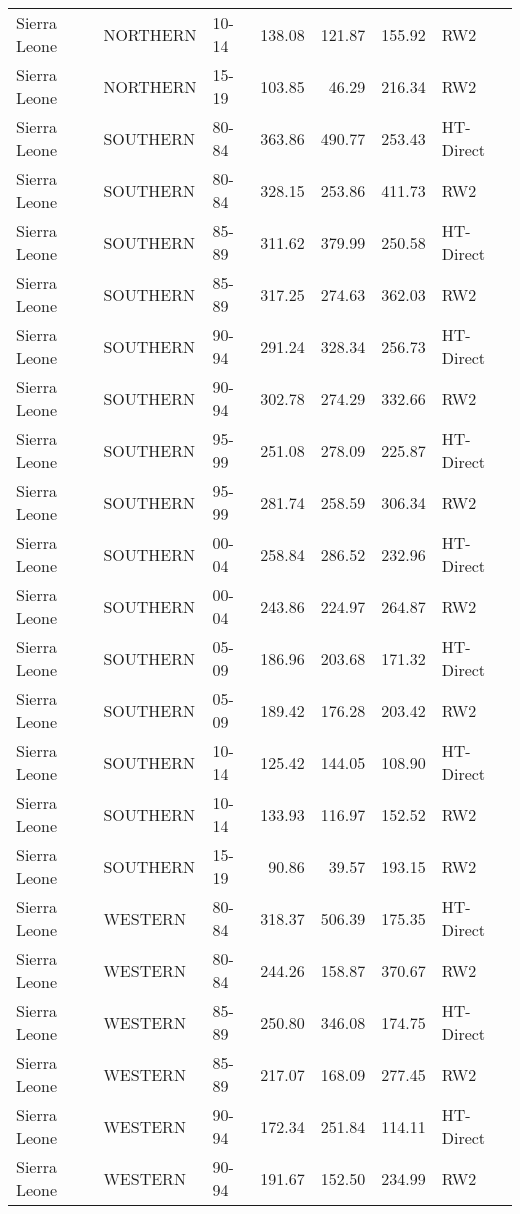 \begin{longtable}{lllrrrl}
  Sierra Leone & NORTHERN & 10-14 & 138.08 & 121.87 & 155.92 & RW2 \\ 
  Sierra Leone & NORTHERN & 15-19 & 103.85 & 46.29 & 216.34 & RW2 \\ 
  Sierra Leone & SOUTHERN & 80-84 & 363.86 & 490.77 & 253.43 & HT-Direct \\ 
  Sierra Leone & SOUTHERN & 80-84 & 328.15 & 253.86 & 411.73 & RW2 \\ 
  Sierra Leone & SOUTHERN & 85-89 & 311.62 & 379.99 & 250.58 & HT-Direct \\ 
  Sierra Leone & SOUTHERN & 85-89 & 317.25 & 274.63 & 362.03 & RW2 \\ 
  Sierra Leone & SOUTHERN & 90-94 & 291.24 & 328.34 & 256.73 & HT-Direct \\ 
  Sierra Leone & SOUTHERN & 90-94 & 302.78 & 274.29 & 332.66 & RW2 \\ 
  Sierra Leone & SOUTHERN & 95-99 & 251.08 & 278.09 & 225.87 & HT-Direct \\ 
  Sierra Leone & SOUTHERN & 95-99 & 281.74 & 258.59 & 306.34 & RW2 \\ 
  Sierra Leone & SOUTHERN & 00-04 & 258.84 & 286.52 & 232.96 & HT-Direct \\ 
  Sierra Leone & SOUTHERN & 00-04 & 243.86 & 224.97 & 264.87 & RW2 \\ 
  Sierra Leone & SOUTHERN & 05-09 & 186.96 & 203.68 & 171.32 & HT-Direct \\ 
  Sierra Leone & SOUTHERN & 05-09 & 189.42 & 176.28 & 203.42 & RW2 \\ 
  Sierra Leone & SOUTHERN & 10-14 & 125.42 & 144.05 & 108.90 & HT-Direct \\ 
  Sierra Leone & SOUTHERN & 10-14 & 133.93 & 116.97 & 152.52 & RW2 \\ 
  Sierra Leone & SOUTHERN & 15-19 & 90.86 & 39.57 & 193.15 & RW2 \\ 
  Sierra Leone & WESTERN & 80-84 & 318.37 & 506.39 & 175.35 & HT-Direct \\ 
  Sierra Leone & WESTERN & 80-84 & 244.26 & 158.87 & 370.67 & RW2 \\ 
  Sierra Leone & WESTERN & 85-89 & 250.80 & 346.08 & 174.75 & HT-Direct \\ 
  Sierra Leone & WESTERN & 85-89 & 217.07 & 168.09 & 277.45 & RW2 \\ 
  Sierra Leone & WESTERN & 90-94 & 172.34 & 251.84 & 114.11 & HT-Direct \\ 
  Sierra Leone & WESTERN & 90-94 & 191.67 & 152.50 & 234.99 & RW2 \\ 

\end{longtable}
